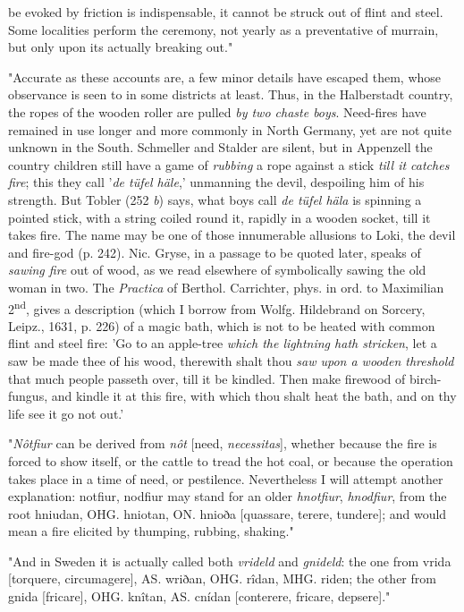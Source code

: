 \documentclass[a4paper, 11pt, oneside, polutonikogreek, english]{article}
\begin{document}
be evoked by friction is indispensable, it cannot be struck out of flint and steel. Some localities perform the ceremony, not yearly as a preventative of murrain, but only upon its actually breaking out."

"Accurate as these accounts are, a few minor details have escaped them, whose observance is seen to in some districts at least. Thus, in the Halberstadt country, the ropes of the wooden roller are pulled \emph{by two chaste boys}. Need-fires have remained in use longer and more commonly in North Germany, yet are not quite unknown in the South. Schmeller and Stalder are silent, but in Appenzell the country children still have a game of \emph{rubbing} a rope against a stick \emph{till it catches fire}; this they call '\emph{de tüfel häle},' unmanning the devil, despoiling him of his strength. But Tobler (252 \emph{b}) says, what boys call \emph{de tüfel häla} is spinning a pointed stick, with a string coiled round it, rapidly in a wooden socket, till it takes fire. The name may be one of those innumerable allusions to Loki, the devil and fire-god (p. 242). Nic. Gryse, in a passage to be quoted later, speaks of \emph{sawing fire} out of wood, as we read elsewhere of symbolically sawing the old woman in two. The \emph{Practica} of Berthol. Carrichter, phys. in ord. to Maximilian 2\textsuperscript{nd}, gives a description (which I borrow from Wolfg. Hildebrand on Sorcery, Leipz., 1631, p. 226) of a magic bath, which is not to be heated with common flint and steel fire: 'Go to an apple-tree \emph{which the lightning hath stricken}, let a saw be made thee of his wood, therewith shalt thou \emph{saw upon a wooden threshold} that much people passeth over, till it be kindled. Then make firewood of birch-fungus, and kindle it at this fire, with which thou shalt heat the bath, and on thy life see it go not out.'

"\emph{Nôtfiur} can be derived from \emph{nôt} [need, \emph{necessitas}], whether because the fire is forced to show itself, or the cattle to tread the hot coal, or because the operation takes place in a time of need, or pestilence. Nevertheless I will attempt another explanation: notfiur, nodfiur may stand for an older \emph{hnotfiur}, \emph{hnodfiur}, from the root hniudan, OHG. hniotan, ON. hnioða [quassare, terere, tundere]; and would mean a fire elicited by thumping, rubbing, shaking."

"And in Sweden it is actually called both \emph{vrideld} and \emph{gnideld}: the one from vrida [torquere, circumagere], AS. wriðan, OHG. rîdan, MHG. riden; the other from gnida [fricare], OHG. knîtan, AS. cnídan [conterere, fricare, depsere]."
\end{document}
